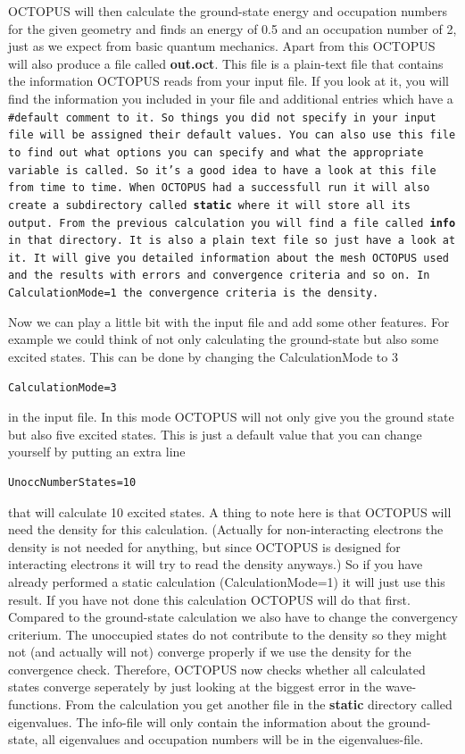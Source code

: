 \documentclass{article}
\begin{document}
OCTOPUS will then calculate the ground-state energy and occupation numbers for
the given geometry and finds an energy of 0.5 and an occupation number of 2,
just as we expect from basic quantum mechanics. Apart from this OCTOPUS will
also produce a file called {\bf out.oct}. This file is a plain-text file that
contains the information OCTOPUS reads from your input file. If you look at it,
you will find the information you included in your file and additional entries
which have a \tt \#default \rm comment to it. So things you did not specify in
your input file will be assigned their default values. You can also use this
file to find out what options you can specify and what the appropriate variable
is called. So it's a good idea to have a look at this file from time to time.
When  OCTOPUS had a successfull run it will also create a subdirectory called
{\bf static} where it will store all its output. From the previous calculation
you will find a file called {\bf info} in that directory. It is also a plain
text file so just have a look at it. It will give you detailed information about
the mesh OCTOPUS used and the results with errors and convergence criteria and
so on. In CalculationMode=1 the convergence criteria is the density.

Now we can play a little bit with the input file and add some other features.
For example we could think of not only calculating the ground-state but also
some excited states. This can be done by changing the CalculationMode to 3

\begin{verbatim}
CalculationMode=3
\end{verbatim}

in the input file. In this mode OCTOPUS will not only give you the ground state
but also five excited states. This is just a default value that you can change
yourself by putting an extra line

\begin{verbatim}
UnoccNumberStates=10
\end{verbatim}

that will calculate 10 excited states. A thing to note here is that OCTOPUS
will need the density for this calculation. (Actually for non-interacting
electrons the density is not needed for anything, but since OCTOPUS is designed
for interacting electrons it will try to read the density anyways.) So if you
have already performed a static calculation (CalculationMode=1) it
will just use this result. If you have not done this calculation OCTOPUS will
do that first. Compared to the ground-state calculation we also have to change
the convergency criterium. The unoccupied states do not contribute to the
density so they might not (and actually will not) converge properly if we use
the density for the convergence check. Therefore, OCTOPUS now checks whether all
calculated states converge seperately by just looking at the biggest error in
the wave-functions. From the calculation you get another file in the {\bf
static} directory called eigenvalues. The info-file will only contain the
information about the ground-state, all eigenvalues and occupation numbers will
be in the eigenvalues-file.
\end{document}
